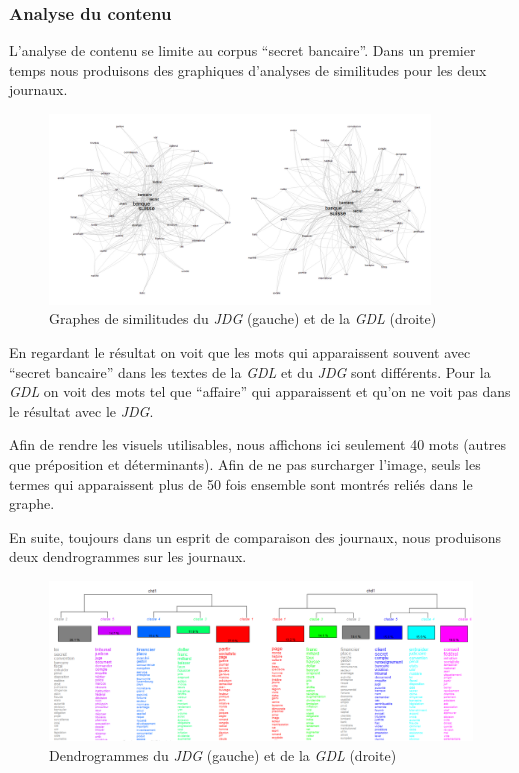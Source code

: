 \hypertarget{analyse-du-contenu}{%
\subsubsection{Analyse du contenu}\label{analyse-du-contenu}}

L'analyse de contenu se limite au corpus ``secret bancaire''. Dans un
premier temps nous produisons des graphiques d'analyses de similitudes
pour les deux journaux.

\begin{figure}
\centering
\includegraphics[width=0.9\textwidth,height=\textheight]{similitude.png}
\caption{Graphes de similitudes du \emph{JDG} (gauche) et de la
\emph{GDL} (droite)}
\end{figure}

En regardant le résultat on voit que les mots qui apparaissent souvent
avec ``secret bancaire'' dans les textes de la \emph{GDL} et du
\emph{JDG} sont différents. Pour la \emph{GDL} on voit des mots tel que
``affaire'' qui apparaissent et qu'on ne voit pas dans le résultat avec
le \emph{JDG}.

Afin de rendre les visuels utilisables, nous affichons ici seulement 40
mots (autres que préposition et déterminants). Afin de ne pas surcharger
l'image, seuls les termes qui apparaissent plus de 50 fois ensemble sont
montrés reliés dans le graphe.

En suite, toujours dans un esprit de comparaison des journaux, nous
produisons deux dendrogrammes sur les journaux.

\begin{figure}
\centering
\includegraphics{dendrogram.png}
\caption{Dendrogrammes du \emph{JDG} (gauche) et de la \emph{GDL}
(droite)}
\end{figure}

